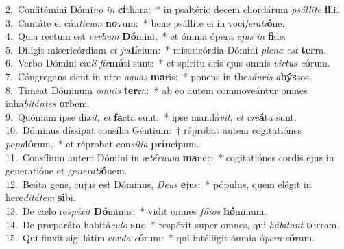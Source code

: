 {2.~}Confitémini Dómi\textit{no} \textit{in} \textbf{cí}thara:~* in psaltério decem chordárum \textit{psál}\textit{li}\textit{te} \textbf{il}li.\\
{3.~}Cantáte ei cán\textit{ti}\textit{cum} \textbf{no}vum:~* bene psállite ei in voci\textit{fe}\textit{ra}\textit{ti}\textbf{ó}ne.\\
{4.~}Quia rectum est \textit{ver}\textit{bum} \textbf{Dó}mini,~* et ómnia ópera \textit{e}\textit{jus} \textit{in} \textbf{fi}de.\\
{5.~}Díligit misericórdiam \textit{et} \textit{ju}\textbf{dí}cium:~* misericórdia Dómini \textit{ple}\textit{na} \textit{est} \textbf{ter}ra.\\
{6.~}Verbo Dómini cæ\textit{li} \textit{fir}\textbf{má}ti sunt:~* et spíritu oris ejus omnis \textit{vir}\textit{tus} \textit{e}\textbf{ó}rum.\\
{7.~}Cóngregans sicut in utre \textit{a}\textit{quas} \textbf{ma}ris:~* ponens in the\textit{sáu}\textit{ris} \textit{a}\textbf{býs}sos.\\
{8.~}Tímeat Dóminum \textit{om}\textit{nis} \textbf{ter}ra:~* ab eo autem commoveántur omnes inha\textit{bi}\textit{tán}\textit{tes} \textbf{or}bem.\\
{9.~}Quóniam ipse di\textit{xit}, \textit{et} \textbf{fa}cta sunt:~* ipse mandá\textit{vit}, \textit{et} \textit{cre}\textbf{á}ta sunt.\\
{10.~}Dóminus díssipat consília Géntium:~† réprobat autem cogitatiónes \textit{po}\textit{pu}\textbf{ló}rum,~* et réprobat con\textit{sí}\textit{li}\textit{a} \textbf{prín}cipum.\\
{11.~}Consílium autem Dómini in æ\textit{tér}\textit{num} \textbf{ma}net:~* cogitatiónes cordis ejus in generatióne et ge\textit{ne}\textit{ra}\textit{ti}\textbf{ó}nem.\\
{12.~}Beáta gens, cujus est Dóminus, \textit{De}\textit{us} \textbf{e}jus:~* pópulus, quem elégit in here\textit{di}\textit{tá}\textit{tem} \textbf{si}bi.\\
{13.~}De cælo re\textit{spé}\textit{xit} \textbf{Dó}minus:~* vidit omnes \textit{fí}\textit{li}\textit{os} \textbf{hó}minum.\\
{14.~}De præparáto habitá\textit{cu}\textit{lo} \textbf{su}o~* respéxit super omnes, qui \textit{há}\textit{bi}\textit{tant} \textbf{ter}ram.\\
{15.~}Qui finxit sigillátim cor\textit{da} \textit{e}\textbf{ó}rum:~* qui intélligit ómnia ó\textit{pe}\textit{ra} \textit{e}\textbf{ó}rum.\\
